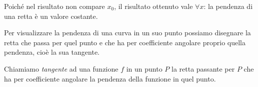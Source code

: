 \vspace{1em}
Poiché nel risultato non compare \(x_0\), il risultato ottenuto
vale \(\forall x\): la pendenza di una retta è un valore costante.


Per visualizzare la pendenza di una curva in un suo punto 
possiamo disegnare la retta che passa per quel punto e che ha per 
coefficiente angolare proprio quella pendenza, cioè la sua tangente.

\begin{definizione}
Chiamiamo \emph{tangente} ad una funzione \(f\) in un punto \(P\) la retta 
passante per \(P\) che ha per coefficiente angolare la pendenza della 
funzione in quel punto.
\end{definizione}


